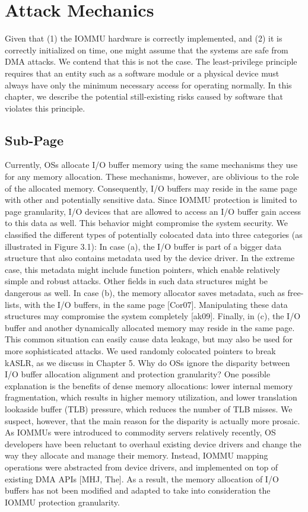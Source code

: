 \section{Attack Mechanics}
Given that (1) the IOMMU hardware is correctly implemented, and (2) it is correctly initialized on time, one might assume that the systems are safe from DMA attacks. We contend that this is not the case. The least-privilege principle requires that an entity such as a software module or a physical device must always have only the minimum necessary access for operating normally. In this chapter, we describe the potential still-existing risks caused by software that violates this principle.
\subsection{Sub-Page} 
Currently, OSs allocate I/O buffer memory using the same mechanisms they use for any memory allocation. These mechanisms, however, are oblivious to the role of the allocated memory. Consequently, I/O buffers may reside in the same page with other and potentially sensitive data. Since IOMMU protection is limited to page granularity, I/O devices that are allowed to access an I/O buffer gain access to this data as well. This behavior might compromise the system security. We classified the different types of potentially colocated data into three categories (as illustrated in Figure 3.1): In case (a), the I/O buffer is part of a bigger data structure that also contains metadata used by the device driver. In the extreme case, this metadata might include function pointers, which enable relatively simple and robust attacks. Other fields in such data structures might be dangerous as well. In case (b), the memory allocator saves metadata, such as free-lists, with the I/O buffers, in the same page [Cor07]. Manipulating these data structures may compromise the system completely [ak09]. Finally, in (c), the I/O buffer and another dynamically allocated memory may reside in the same page. This common situation can easily cause data leakage, but may also be used for more sophisticated attacks. We used randomly colocated pointers to break kASLR, as we discuss in Chapter 5. Why do OSs ignore the disparity between I/O buffer allocation alignment and protection granularity? One possible explanation is the benefits of dense memory allocations: lower internal memory fragmentation, which results in higher memory utilization, and lower translation lookaside buffer (TLB) pressure, which reduces the number of TLB misses. We suspect, however, that the main reason for the disparity is actually more prosaic. As IOMMUs were introduced to commodity servers relatively recently, OS developers have been reluctant to overhaul existing device drivers and change the way they allocate and manage their memory. Instead, IOMMU mapping operations were abstracted from device drivers, and implemented on top of existing DMA APIs [MHJ, The]. As a result, the memory allocation of I/O buffers has not been modified and adapted to take into consideration the IOMMU protection granularity.
